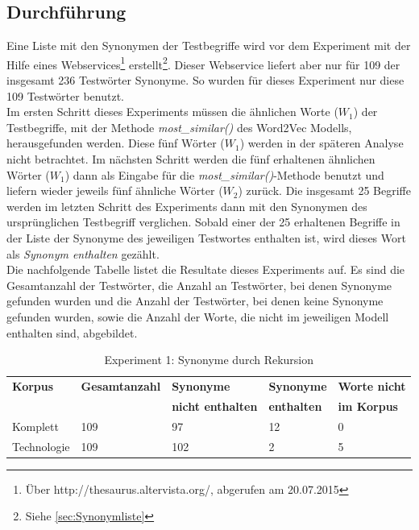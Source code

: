 \documentclass[12pt,a4paper]{report}
\begin{document}
		\subsection*{Durchführung}
		Eine Liste mit den Synonymen der Testbegriffe wird vor dem Experiment mit der Hilfe eines Webservices\footnote{Über http://thesaurus.altervista.org/, abgerufen am 20.07.2015} erstellt\footnote{Siehe \ref{sec:Synonymliste}}. Dieser Webservice liefert aber nur für 109 der insgesamt 236 Testwörter Synonyme. So wurden für dieses Experiment nur diese 109 Testwörter benutzt.\\
		Im ersten Schritt dieses Experiments müssen die ähnlichen Worte ($W_1$) der Testbegriffe, mit der Methode \textit{most\_similar()} des Word2Vec Modells, herausgefunden werden. Diese fünf Wörter ($W_1$) werden in der späteren Analyse nicht betrachtet. Im nächsten Schritt werden die fünf erhaltenen ähnlichen Wörter ($W_1$) dann als Eingabe für die \textit{most\_similar()}-Methode benutzt und liefern wieder jeweils fünf ähnliche Wörter ($W_2$) zurück. Die insgesamt 25 Begriffe werden im letzten Schritt des Experiments dann mit den Synonymen des ursprünglichen Testbegriff verglichen. Sobald einer der 25 erhaltenen Begriffe in der Liste der Synonyme des jeweiligen Testwortes enthalten ist, wird dieses Wort als \textit{Synonym enthalten} gezählt.\\
		Die nachfolgende Tabelle listet die Resultate dieses Experiments auf. Es sind die Gesamtanzahl der Testwörter, die Anzahl an Testwörter, bei denen Synonyme gefunden wurden und die Anzahl der Testwörter, bei denen keine Synonyme gefunden wurden, sowie die Anzahl der Worte, die nicht im jeweiligen Modell enthalten sind, abgebildet.
		
		

		
		
\begin{table}[H]
\caption{Experiment 1: Synonyme durch Rekursion}
\begin{center}
\begin{tabular}{|l||l|l|l|l|}
\hline
\textbf{Korpus} & \textbf{Gesamtanzahl}	&\textbf{Synonyme} & \textbf{Synonyme}  & \textbf{Worte nicht}  \\
 &			& \textbf{nicht enthalten} & \textbf{enthalten} & \textbf{im Korpus}  \\

\hline
 Komplett & 109 & 97 & 12 & 0 \\
 \hline
 Technologie & 109 & 102 & 2 & 5 \\
 \hline
 
\end{tabular}
\end{center}
\end{table}
		
\end{document}
